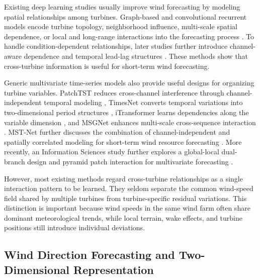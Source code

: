 Existing deep learning studies usually improve wind forecasting by modeling spatial relationships among turbines. Graph-based and convolutional recurrent models encode turbine topology, neighborhood influence, multi-scale spatial dependence, or local and long-range interactions into the forecasting process \cite{Song2023ShortTermForecastingGraphConvolutionWindPower,Zhang2019LSTMNeighborhoodGatesCausalityWindSpeed,Wu2024MixFormerHierarchicalContextWindSpeed,Crossformer2023CrossDimensionDependency}. To handle condition-dependent relationships, later studies further introduce channel-aware dependence and temporal lead-lag structures \cite{Zhao2024RethinkingChannelDependenceLeadingIndicators,Zhu2024GGNetTemporalLeadLagCorrelations,Nie2024ChannelAwareLowRankAdaptation,DDFormer2026FlexibleChannelDependence}. These methods show that cross-turbine information is useful for short-term wind forecasting.

Generic multivariate time-series models also provide useful designs for organizing turbine variables. PatchTST reduces cross-channel interference through channel-independent temporal modeling \cite{Nie2023PatchTST}, TimesNet converts temporal variations into two-dimensional period structures \cite{Wu2023TimesNetTemporal2DVariationModeling}, iTransformer learns dependencies along the variable dimension \cite{Liu2024iTransformer}, and MSGNet enhances multi-scale cross-sequence interaction \cite{Cai2024MSGNetLearningMultiScaleInterSeriesCorrelations}\cite{Autoformer2021DecompositionAutoCorrelation,FEDformer2022FrequencyEnhanced,Zerveas2021TimeSeriesRepresentation,NBEATS2020InterpretableForecasting}. MST-Net further discusses the combination of channel-independent and spatially correlated modeling for short-term wind resource forecasting \cite{Lou2026MSTNet,Wang2024TimeMixerDecomposableMultiscaleMixing}. More recently, an Information Sciences study further explores a global-local dual-branch design and pyramid patch interaction for multivariate forecasting \cite{Zhou2026GLPTGlobalLocalPyramidTransformer}.

However, most existing methods regard cross-turbine relationships as a single interaction pattern to be learned. They seldom separate the common wind-speed field shared by multiple turbines from turbine-specific residual variations. This distinction is important because wind speeds in the same wind farm often share dominant meteorological trends, while local terrain, wake effects, and turbine positions still introduce individual deviations.

\subsection{Wind Direction Forecasting and Two-Dimensional Representation}

